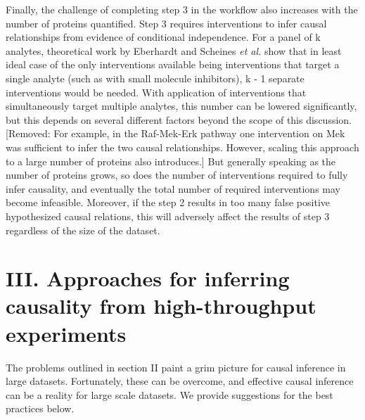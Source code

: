\documentclass[journal=jacsat,manuscript=article]{achemso}
\def\added#1{{\color{blue} #1}}
\def\removed#1{{\color{magenta}[Removed: #1]}}
\begin{document}
\added{Finally, the challenge of completing step 3 in the workflow also increases with the number of proteins quantified.}  Step 3 requires interventions to infer causal relationships from evidence of conditional independence.  \added{For a panel of k analytes, theoretical work by Eberhardt and Scheines {\it et al.} \cite{eberhardt2012number} show that in least ideal case of the only interventions available being interventions that target a single analyte (such as with small molecule inhibitors), k - 1 separate interventions would be needed.  With application of interventions that simultaneously target multiple analytes, this number can be lowered significantly, but this depends on several different factors\cite{eberhardt2012number,hauser2012two,hyttinen2013experiment} beyond the scope of this discussion.} \removed{For example, in the Raf-Mek-Erk pathway one intervention on Mek was sufficient to infer the two causal relationships. However, scaling this approach to a large number of proteins also introduces.}  But generally speaking as the number of proteins grows, so does the number of interventions required to fully infer causality, and eventually the total number of required interventions may become infeasible. Moreover, if the step 2 results in too many false positive hypothesized causal relations, this will adversely affect the results of step 3 regardless of the size of the dataset.


\section{III. Approaches for inferring causality from high-throughput experiments}

The problems outlined in section II paint a grim picture for causal inference in large datasets. Fortunately, these can be overcome, and effective causal inference can be a reality for large scale datasets.  We provide suggestions for the best practices below.
\end{document}
